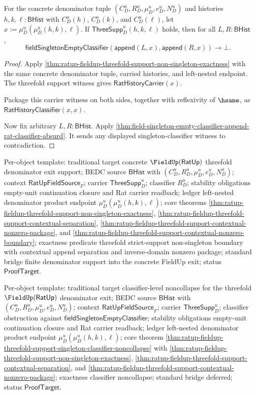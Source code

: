 \begin{theorem}
\label{thm:ratup-fieldup-threefold-support-singleton-classifier-noncollapse}
For the concrete denominator tuple $(C_D^u,R_D^u,\mu_D^u,e_D^u,N_D^u)$ and
histories $h,k,\ell:\mathsf{BHist}$ with $C_D^u(h)$, $C_D^u(k)$, and
$C_D^u(\ell)$, let $x:=\mu_D^u(\mu_D^u(h,k),\ell)$. If
$\mathsf{ThreeSupp}_D^u(h,k,\ell)$ holds, then for all $L,R:\mathsf{BHist}$,
$$
\mathsf{fieldSingletonEmptyClassifier}(\mathsf{append}(L,x),\mathsf{append}(R,x))
\to\bot.
$$
\end{theorem}
\begin{proof}
Apply
\autoref{thm:ratup-fieldup-threefold-support-non-singleton-exactness} with the
same concrete denominator tuple, carried histories, and left-nested endpoint.
The threefold support witness gives $\mathsf{RatHistoryCarrier}(x)$.

Package this carrier witness on both sides, together with reflexivity of
$\hsame$, as $\mathsf{RatHistoryClassifier}(x,x)$.

Now fix arbitrary $L,R:\mathsf{BHist}$. Apply
\autoref{thm:field-singleton-empty-classifier-append-rat-classifier-absurd}.
It sends any displayed singleton-classifier witness to contradiction.
\end{proof}

Per-object template: traditional target concrete $\FieldUp(\mathsf{RatUp})$
threefold denominator exit support; BEDC source $\mathsf{BHist}$ with
$(C_D^u,R_D^u,\mu_D^u,e_D^u,N_D^u)$; context
$\mathsf{RatUpFieldSource}_F$; carrier $\mathsf{ThreeSupp}_D^u$; classifier
$R_D^u$; stability obligations empty-unit continuation closure and Rat
carrier readback; ledger left-nested denominator product endpoint
$\mu_D^u(\mu_D^u(h,k),\ell)$; core theorems
\autoref{thm:ratup-fieldup-threefold-support-non-singleton-exactness},
\autoref{thm:ratup-fieldup-threefold-support-contextual-separation},
\autoref{thm:ratup-fieldup-threefold-support-contextual-nonzero-package}, and
\autoref{thm:ratup-fieldup-threefold-support-contextual-nonzero-boundary};
exactness predicate threefold strict-support non-singleton boundary with contextual
append separation and inverse-domain nonzero package; standard bridge finite
denominator support into the concrete FieldUp exit; status $\mathsf{ProofTarget}$.

Per-object template: traditional target classifier-level noncollapse for the
threefold $\FieldUp(\mathsf{RatUp})$ denominator exit; BEDC source
$\mathsf{BHist}$ with $(C_D^u,R_D^u,\mu_D^u,e_D^u,N_D^u)$; context
$\mathsf{RatUpFieldSource}_F$; carrier $\mathsf{ThreeSupp}_D^u$; classifier
obstruction against $\mathsf{fieldSingletonEmptyClassifier}$; stability
obligations empty-unit continuation closure and Rat carrier readback; ledger
left-nested denominator product endpoint $\mu_D^u(\mu_D^u(h,k),\ell)$; core
theorem
\autoref{thm:ratup-fieldup-threefold-support-singleton-classifier-noncollapse}
with \autoref{thm:ratup-fieldup-threefold-support-non-singleton-exactness},
\autoref{thm:ratup-fieldup-threefold-support-contextual-separation}, and
\autoref{thm:ratup-fieldup-threefold-support-contextual-nonzero-package};
exactness classifier noncollapse; standard bridge deferred; status
$\mathsf{ProofTarget}$.

